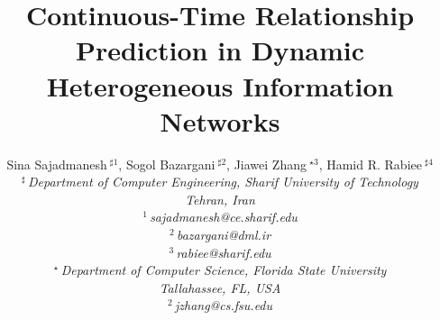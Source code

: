 \documentclass[10pt,conference,letterpaper]{IEEEtran}
\title{Continuous-Time Relationship Prediction in Dynamic Heterogeneous Information Networks}
\author{%
{Sina Sajadmanesh{\small $~^{\sharp1}$}, Sogol Bazargani{\small $~^{\sharp2}$}, Jiawei Zhang{\small $~^{\star3}$}, Hamid R. Rabiee{\small $~^{\sharp4}$} }%
\vspace{1.6mm}\\
\fontsize{10}{10}\selectfont\itshape
$^{\sharp}$\,Department of Computer Engineering, Sharif University of Technology\\
Tehran, Iran\\
\fontsize{9}{9}\selectfont\ttfamily\upshape
%
$^{1}$\,sajadmanesh@ce.sharif.edu\\
$^{2}$\,bazargani@dml.ir\\
$^{3}$\,rabiee@sharif.edu%
\vspace{1.2mm}\\
\fontsize{10}{10}\selectfont\rmfamily\itshape
$^{\star}$\,Department of Computer Science, Florida State University\\
Tallahassee, FL, USA\\
\fontsize{9}{9}\selectfont\ttfamily\upshape
$^{2}$\,jzhang@cs.fsu.edu
}
\begin{document}
\maketitle
%

\newcommand\sina[1]{\textbf{\textcolor{red}{Sina: #1}}}

\newtheorem{definition}{Definition}
\newcommand{\descr}[1]{\smallskip\noindent\textbf{#1}}
\newcommand{\npglm}{{\textsc{Np-Glm}}\xspace}
\newcommand{\mb}[1]{\mathbf{#1}}
\newcommand{\mc}[1]{\mathcal{#1}}
\newcommand\xrsquigarrow[1]{%
	\stepcounter{sarrow}%
	\begin{tikzpicture}[decoration=snake]
	\node (\thesarrow) {\strut#1};
	\draw[->,decorate] (\thesarrow.south west) -- (\thesarrow.south east);
	\end{tikzpicture}%
}






%
%



%
%


\balance

\end{document}

